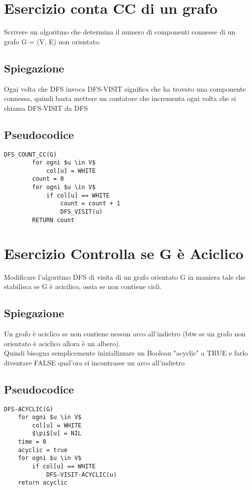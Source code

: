 \documentclass[12pt, a4paper, openany]{book}
\begin{document}
    \section{Esercizio conta CC di un grafo}
    Scrivere un algoritmo che determina il numero di componenti connesse di un grafo G =
    (V, E) non orientato.

    \subsection*{Spiegazione}
    Ogni volta che DFS invoca DFS-VISIT significa che ha trovato una componente connessa, quindi basta mettere un contatore che incrementa ogni volta che si chiama DFS-VISIT da DFS
    \subsection*{Pseudocodice}
    \begin{lstlisting}[mathescape=true]
    DFS_COUNT_CC(G)
        for ogni $u \in V$
            col[u] = WHITE
        count = 0
        for ogni $u \in V$
            if col[u] == WHITE
                count = count + 1
                DFS_VISIT(u)
        RETURN count
\end{lstlisting}

    \section{Esercizio Controlla se G è Aciclico}
    Modificare l’algoritmo DFS di visita di un grafo orientato G in maniera tale che stabilisca
    se G è acicilico, ossia se non contiene cicli.
    \subsection*{Spiegazione}
    Un grafo è aciclico se non contiene nessun arco all'indietro (btw se un grafo non orientato è aciclico allora è un albero).
    \\Quindi bisogna semplicemente iniziallizzare un Boolean "acyclic" a TRUE e farlo diventare FALSE qual'ora si incontrasse un arco all'indietro

    \subsection*{Pseudocodice}
    \begin{lstlisting}[mathescape=true]
DFS-ACYCLIC(G)
    for ogni $u \in V$
        col[u] = WHITE
        $\pi$[u] = NIL
    time = 0
    acyclic = true
    for ogni $u \in V$
        if col[u] == WHITE
            DFS-VISIT-ACYCLIC(u)
    return acyclic    
\end{lstlisting}
\end{document}
